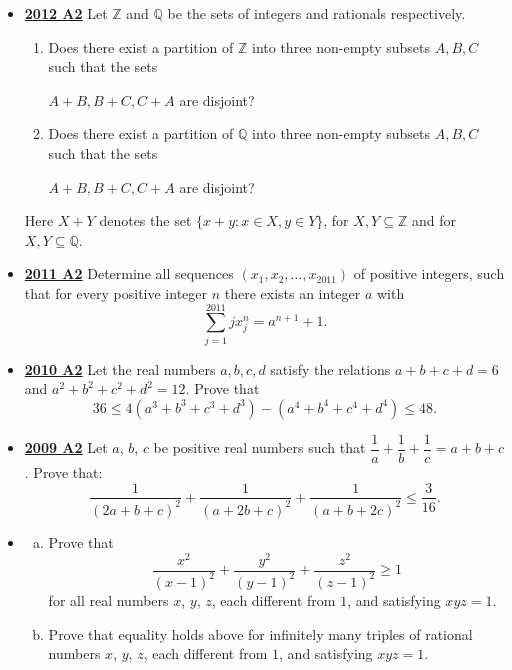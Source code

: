 \documentclass[11pt]{scrartcl}
\begin{document}
\begin{itemize}[leftmargin=*]
\item \href{https://artofproblemsolving.com/community/c6h546162p3160551}{\textbf{2012 A2}} Let $\mathbb{Z}$ and $\mathbb{Q}$ be the sets of integers and rationals respectively.
\begin{enumerate}
\item[(a)] Does there exist a partition of $\mathbb{Z}$ into three non-empty subsets $A,B,C$ such that the sets 

$A+B, B+C, C+A$ are disjoint?
\item[(b)] Does there exist a partition of $\mathbb{Q}$ into three non-empty subsets $A,B,C$ such that the sets 

$A+B, B+C, C+A$ are disjoint?
\end{enumerate}
Here $X+Y$ denotes the set $\{ x+y : x \in X, y \in Y \}$, for $X,Y \subseteq \mathbb{Z}$ and for $X,Y \subseteq \mathbb{Q}$.
\item \href{https://artofproblemsolving.com/community/c6h488534p2737640}{\textbf{2011 A2}} Determine all sequences $(x_1,x_2,\dots,x_{2011})$ of positive integers, such that for every positive integer $n$ there exists an integer $a$ with\[\sum^{2011}_{j=1} j  x^n_j = a^{n+1} + 1.\]
\item \href{https://artofproblemsolving.com/community/c6h418679p2362276}{\textbf{2010 A2}} Let the real numbers $a,b,c,d$ satisfy the relations $a+b+c+d=6$ and $a^2+b^2+c^2+d^2=12.$ Prove that
\[36 \leqslant 4 \left(a^3+b^3+c^3+d^3\right) - \left(a^4+b^4+c^4+d^4 \right) \leqslant 48.\]
\item \href{https://artofproblemsolving.com/community/c6h355781p1932917}{\textbf{2009 A2}} Let $a$, $b$, $c$ be positive real numbers such that $\dfrac{1}{a} + \dfrac{1}{b} + \dfrac{1}{c} = a+b+c$. Prove that:
\[\frac{1}{(2a+b+c)^2}+\frac{1}{(a+2b+c)^2}+\frac{1}{(a+b+2c)^2}\leqslant \frac{3}{16}.\]
\item {}
\begin{enumerate}[(a)]
    \item Prove that
\[\frac {x^{2}}{\left(x - 1\right)^{2}} + \frac {y^{2}}{\left(y - 1\right)^{2}} + \frac {z^{2}}{\left(z - 1\right)^{2}} \geqslant  1\]for all real numbers $x$, $y$, $z$, each different from $1$, and satisfying $xyz=1$.
    \item Prove that equality holds above for infinitely many triples of rational numbers $x$, $y$, $z$, each different from $1$, and satisfying $xyz=1$.
\end{enumerate}



\end{itemize}
\end{document}
